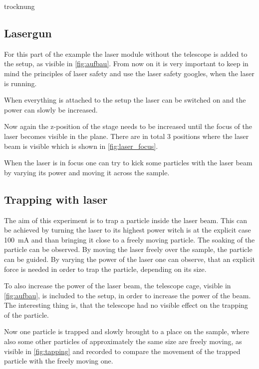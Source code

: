 \documentclass[12pt,english,ngerman]{scrartcl}
\begin{document}

trocknung
\subsection{Lasergun}

For this part of the example the laser module without the telescope is added to the setup, as visible in \autoref{fig:aufbau}.
From now on it is very important to keep in mind the principles of laser safety and use the laser safety googles, 
when the laser is running.

When everything is attached to the setup the laser can be switched on and the power can slowly be increased.

Now again the z-position of the stage needs to be increased until the focus of the laser becomes visible in the plane.
There are in total 3 positions where the laser beam is visible which is shown in \autoref{fig:laser_focus}.


When the laser is in focus one can try to kick some particles with the laser beam by varying its power and moving it 
across the sample.

\subsection{Trapping with laser}

The aim of this experiment is to trap a particle inside the laser beam. This can be achieved by turning the laser to 
its highest power witch is at the explicit case \SI{100}{\milli\ampere} and than bringing it close to a freely moving particle.
The soaking of the particle can be observed. By moving the laser freely over the sample, the particle can be guided.
By varying the power of the laser one can observe, that an explicit force is needed in order to trap the particle, depending on its size.

To also increase the power of the laser beam, the telescope cage, visible in \autoref{fig:aufbau}, is included to the setup, in order to 
increase the power of the beam.
The interesting thing is, that the telescope had no visible effect on the trapping of the particle.

Now one particle is trapped and slowly brought to a place on the sample, where also some other particles of approximately the
same size are freely moving, as visible in \autoref{fig:tapping} and recorded to compare the movement of the trapped particle 
with the freely moving one.
\end{document}
